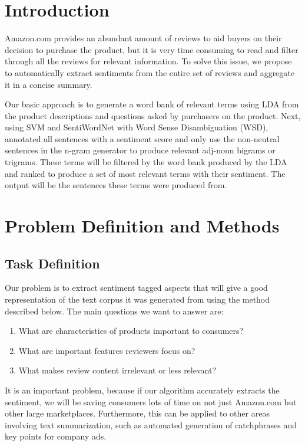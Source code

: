 \documentclass{article}
\begin{document}
 


\section{Introduction}
Amazon.com provides an abundant amount of reviews to aid buyers on their decision to purchase the product, but it is very time consuming to read and filter through all the reviews for relevant information.
To solve this issue, we propose to automatically extract sentiments from the entire set of reviews and aggregate it in a concise summary.

Our basic approach is to generate a word bank of relevant terms using LDA from the product descriptions and questions asked by purchasers on the product. Next, using SVM and SentiWordNet with Word Sense Disambiguation (WSD), annotated all sentences with a sentiment score and only use the non-neutral sentences in the n-gram generator to produce relevant adj-noun bigrams or trigrams. These terms will be filtered by the word bank produced by the LDA and ranked to produce a set of most relevant terms with their sentiment. The output will be the sentences these terms were produced from.  

\section{Problem Definition and Methods} 
 \subsection{Task Definition}
Our problem is to extract sentiment tagged aspects that will give a good representation of the text corpus it was generated from using the method described below. The main questions we want to answer are:
\begin{enumerate}
\item What are characteristics of products important to consumers?
\item What are important features reviewers focus on?
\item What makes review content irrelevant or less relevant?
\end{enumerate}

It is an important problem, because if our algorithm accurately extracts the sentiment, we will be saving consumers lots of time on not just Amazon.com but other large marketplaces. Furthermore, this can be applied to other areas involving text summarization, such as automated generation of catchphrases and key points for company ads.
\end{document}
